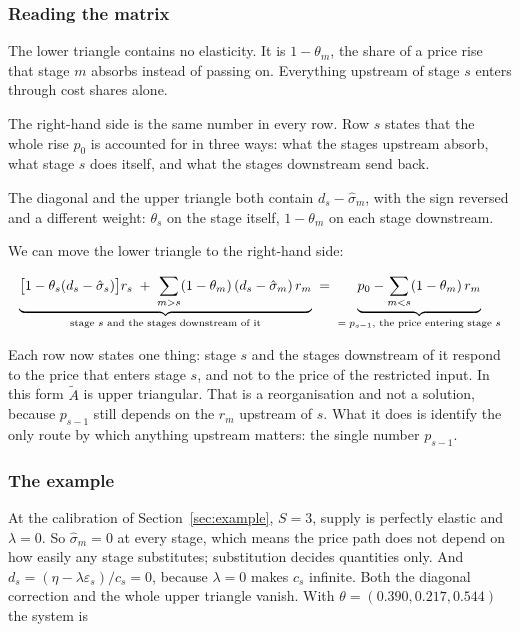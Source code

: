\documentclass[11pt,a4paper]{article}
\begin{document}
\subsubsection*{Reading the matrix}

The lower triangle contains no elasticity. It is $1 - \theta_m$, the share of a price rise that stage $m$ absorbs instead of passing on. Everything upstream of stage $s$ enters through cost shares alone.

The right-hand side is the same number in every row. Row $s$ states that the whole rise $p_0$ is accounted for in three ways: what the stages upstream absorb, what stage $s$ does itself, and what the stages downstream send back.

The diagonal and the upper triangle both contain $d_s - \hat\sigma_m$, with the sign reversed and a different weight: $\theta_s$ on the stage itself, $1-\theta_m$ on each stage downstream.

We can move the lower triangle to the right-hand side:

\begin{equation}
\resizebox{\textwidth}{!}{$\displaystyle
\underbrace{\big[1 - \theta_s(d_s - \hat\sigma_s)\big] r_s
\;+\; \sum_{m>s} (1-\theta_m)\,(d_s - \hat\sigma_m)\, r_m}_{\text{stage } s \text{ and the stages downstream of it}}
\;=\;
\underbrace{p_0 - \sum_{m<s}(1-\theta_m)\, r_m}_{=\; p_{s-1}, \text{ the price entering stage } s}
$}
\end{equation}

Each row now states one thing: stage $s$ and the stages downstream of it respond to the price that enters stage $s$, and not to the price of the restricted input. In this form $\tilde A$ is upper triangular. That is a reorganisation and not a solution, because $p_{s-1}$ still depends on the $r_m$ upstream of $s$. What it does is identify the only route by which anything upstream matters: the single number $p_{s-1}$.



\subsubsection*{The example}

At the calibration of Section~\ref{sec:example}, $S = 3$, supply is perfectly elastic and $\lambda = 0$. So $\hat\sigma_m = 0$ at every stage, which means the price path does not depend on how easily any stage substitutes; substitution decides quantities only. And $d_s = (\eta - \lambda \varepsilon_s)/c_s = 0$, because $\lambda = 0$ makes $c_s$ infinite. Both the diagonal correction and the whole upper triangle vanish. With $\theta = (0.390, 0.217, 0.544)$ the system is
\end{document}
